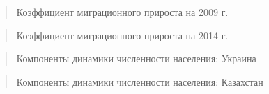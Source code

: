 \documentclass[]{book}
\begin{document}
\begin{quote}
Коэффициент миграционного прироста на 2009 г.
\end{quote}

\begin{quote}
Коэффициент миграционного прироста на 2014 г.
\end{quote}

\begin{quote}
Компоненты динамики численности населения: Украина
\end{quote}

\begin{quote}
Компоненты динамики численности населения: Казахстан
\end{quote}


\end{document}
